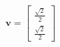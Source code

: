 \documentclass[preview]{standalone}
\begin{document}
\begin{align*}
\mathbf{v} = \begin{bmatrix} \frac{\sqrt{2}}{2} \\ \frac{\sqrt{2}}{2} \end{bmatrix}
\end{align*}
\end{document}
